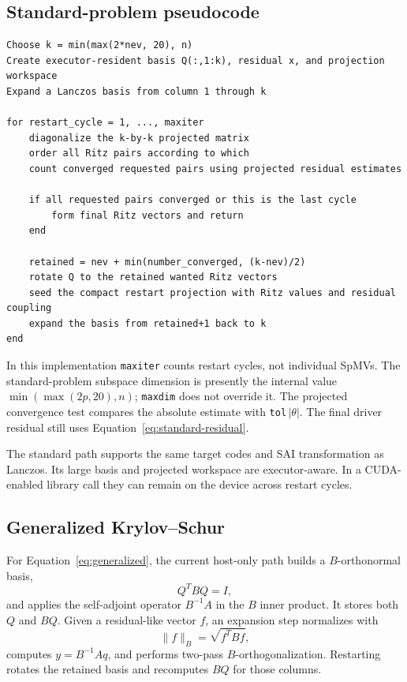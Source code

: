 \documentclass[11pt]{article}
\newcommand{\code}[1]{\texttt{#1}}
\begin{document}
\subsection{Standard-problem pseudocode}

\begin{lstlisting}
Choose k = min(max(2*nev, 20), n)
Create executor-resident basis Q(:,1:k), residual x, and projection workspace
Expand a Lanczos basis from column 1 through k

for restart_cycle = 1, ..., maxiter
    diagonalize the k-by-k projected matrix
    order all Ritz pairs according to which
    count converged requested pairs using projected residual estimates

    if all requested pairs converged or this is the last cycle
        form final Ritz vectors and return
    end

    retained = nev + min(number_converged, (k-nev)/2)
    rotate Q to the retained wanted Ritz vectors
    seed the compact restart projection with Ritz values and residual coupling
    expand the basis from retained+1 back to k
end
\end{lstlisting}

In this implementation \code{maxiter} counts restart cycles, not individual
SpMVs.  The standard-problem subspace dimension is presently the internal value
$\min(\max(2p,20),n)$; \code{maxdim} does not override it.  The projected
convergence test compares the absolute estimate with
\code{tol}$\,|\theta|$.  The final driver residual still uses
Equation~\eqref{eq:standard-residual}.

The standard path supports the same target codes and SAI transformation as
Lanczos.  Its large basis and projected workspace are executor-aware.  In a
CUDA-enabled library call they can remain on the device across restart cycles.

\subsection{Generalized Krylov--Schur}

For Equation~\eqref{eq:generalized}, the current host-only path builds a
$B$-orthonormal basis,
\begin{equation}
  Q^TBQ=I,
\end{equation}
and applies the self-adjoint operator $B^{-1}A$ in the $B$ inner product.  It
stores both $Q$ and $BQ$.  Given a residual-like vector $f$, an expansion step
normalizes with
\begin{equation}
  \lVert f\rVert_B=\sqrt{f^TBf},
\end{equation}
computes $y=B^{-1}Aq$, and performs two-pass $B$-orthogonalization.  Restarting
rotates the retained basis and recomputes $BQ$ for those columns.
\end{document}
